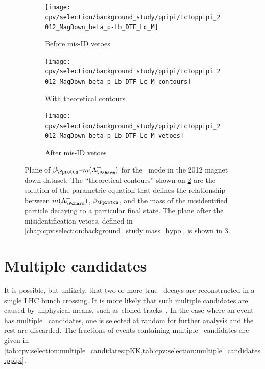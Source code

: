 \begin{figure}
  \begin{subfigure}[b]{0.5\textwidth}
    \texttt{[image: cpv/selection/background\_study/ppipi/LcToppipi\_2012\_MagDown\_beta\_p-Lb\_DTF\_Lc\_M]}
    \caption{Before mis-ID vetoes}
    \label{fig:cpv:selection:background_study:mom_asym:ppipi:before}
  \end{subfigure}
  \begin{subfigure}[b]{0.5\textwidth}
    \texttt{[image: cpv/selection/background\_study/ppipi/LcToppipi\_2012\_MagDown\_beta\_p-Lb\_DTF\_Lc\_M\_contours]}
    \caption{With theoretical contours}
    \label{fig:cpv:selection:background_study:mom_asym:ppipi:contours}
  \end{subfigure}
  \begin{subfigure}[b]{0.5\textwidth}
    \texttt{[image: cpv/selection/background\_study/ppipi/LcToppipi\_2012\_MagDown\_beta\_p-Lb\_DTF\_Lc\_M-vetoes]}
    \caption{After mis-ID vetoes}
    \label{fig:cpv:selection:background_study:mom_asym:ppipi:after}
  \end{subfigure}
  \caption{%
    Plane of $\beta_{\Pproton}$--$m(\PLambdac)$ for the \ppipi\ mode in the 
    2012 magnet down dataset.
    The ``theoretical contours'' shown on 
    \cref{fig:cpv:selection:background_study:mom_asym:ppipi:contours} are the 
    solution of the parametric equation that defines the relationship between 
    $m(\PLambdac)$, $\beta_{\Pproton}$, and the mass of the misidentified 
    particle decaying to a particular final state.
    The plane after the misidentification vetoes, defined in 
    \cref{chap:cpv:selection:background_study:mass_hypo}, is shown in 
    \cref{fig:cpv:selection:background_study:mom_asym:ppipi:after}.
  }
  \label{fig:cpv:selection:background_study:mom_asym:ppipi}
\end{figure}

\section{Multiple candidates}
\label{chap:cpv:selection:multiple_candidates}

It is possible, but unlikely, that two or more true \LcTophh\ decays are 
reconstructed in a single \ac{LHC} bunch crossing.
It is more likely that such multiple candidates are caused by unphysical means, 
such as cloned tracks~\cite{LHCb-INT-2011-009}.
In the case where an event has multiple \PLambdac\ candidates, one is selected 
at random for further analysis and the rest are discarded.
The fractions of events containing multiple \PLambdac\ candidates are given in 
\cref{tab:cpv:selection:multiple_candidates:pKK,tab:cpv:selection:multiple_candidates:ppipi}.

